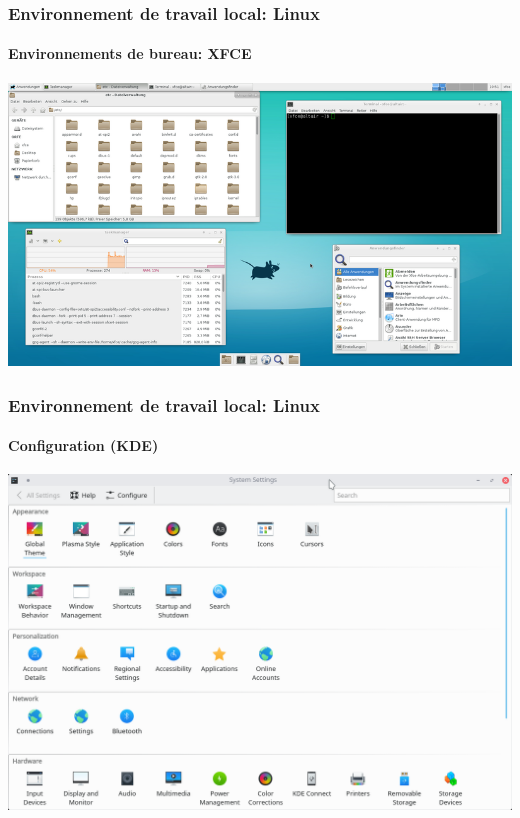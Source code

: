 \documentclass{beamer}
\begin{document}
\begin{frame}
\frametitle{Environnement de travail local: Linux}
\framesubtitle{Environnements de bureau: XFCE}

\begin{center}
	\includegraphics[height=
.8\textheight]{../img/Bweb01-environnement/xfce.png}
\end{center}

\end{frame}

\begin{frame}
\frametitle{Environnement de travail local: Linux}
\framesubtitle{Configuration (KDE)}

\begin{center}
	\includegraphics[height=
	.8\textheight]{../img/Bweb01-environnement/kde-config.png}
\end{center}

\end{frame}
\end{document}
